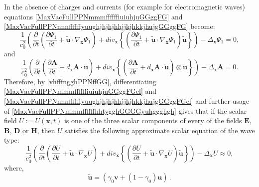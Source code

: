 \documentclass{article}
\theoremstyle{definition}
\theoremstyle{remark}
\renewcommand{\vec}[1]{\mathbf{#1}}
\newcommand{\er}{\eqref}
\newcommand{\er}{\eqref}
\begin{document}
In the absence of charges and currents (for example for
electromagnetic waves) equations
\er{MaxVacFullPPNmmmffffffiuiuhjuGGggFG} and
\er{MaxVacFullPPNnnnffffffyuughjhjhjhhjjkjhkkjhujgGGggFG} become:
\begin{equation}\label{MaxVacFullPPNmmmffffffiuiuhjuGGggFGel}
\frac{1}{c^2_0}\left(\frac{\partial}{\partial
t}\left(\frac{\partial\Psi_1}{\partial t}+\vec {\tilde
u}\cdot\nabla_{\vec x}\Psi_1\right)+div_{\vec x}
\left\{\left(\frac{\partial\Psi_1}{\partial t}+\vec {\tilde
u}\cdot\nabla_{\vec x}\Psi_1\right)\vec {\tilde
u}\right\}\right)-\Delta_{\vec x}\Psi_1=0,
\end{equation}
and
\begin{equation}\label{MaxVacFullPPNnnnffffffyuughjhjhjhhjjkjhkkjhujgGGggFGel}
\frac{1}{c^2_0}\left(\frac{\partial}{\partial
t}\left(\frac{\partial\vec A}{\partial t}+d_{\vec x}\vec A\cdot\vec
{\tilde u}\right)+div_{\vec x} \left\{\left(\frac{\partial\vec
A}{\partial t}+d_{\vec x}\vec A\cdot\vec {\tilde
u}\right)\otimes\vec {\tilde u}\right\}\right)-\Delta_{\vec x}\vec
A=0.
\end{equation}
Therefore, by \er{vhfffngghPPNffGG}, differentiating
\er{MaxVacFullPPNmmmffffffiuiuhjuGGggFGel} and
\er{MaxVacFullPPNnnnffffffyuughjhjhjhhjjkjhkkjhujgGGggFGel} and
further usage of \er{MaxVacFullPPNmmmffffffhhtygghGGGGyuhggghgh}
gives that if the scalar field $U:=U(\vec x,t)$ is one of the three
scalar components of every of the fields $\vec E$, $\vec B$, $\vec
D$ or $\vec H$, then $U$ satisfies the following approximate scalar
equation of the wave type:
\begin{equation}\label{MaxVacFullPPNmmmffffffiuiuhjuGGggFGelGHGHGHGG}
\frac{1}{c^2_0}\left(\frac{\partial}{\partial t}\left(\frac{\partial
U}{\partial t}+\vec {\tilde u}\cdot\nabla_{\vec x}U\right)+div_{\vec
x} \left\{\left(\frac{\partial U}{\partial t}+\vec {\tilde
u}\cdot\nabla_{\vec x} U\right)\vec {\tilde
u}\right\}\right)-\Delta_{\vec x}U \approx 0,
\end{equation}
where,
\begin{equation}\label{uyuyuyy}
\vec {\tilde u}=\left(\gamma_0\vec v+(1-\gamma_0)\vec u\right)\,.
\end{equation}
\end{document}
